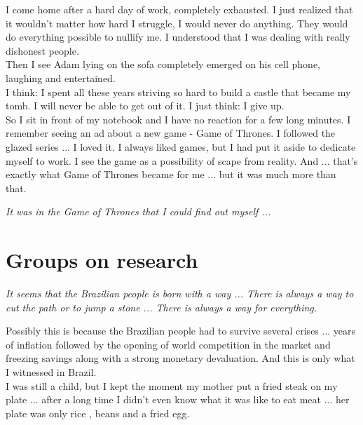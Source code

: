 \documentclass[11pt]{book}
\begin{document}
\noindent I come home after a hard day of work, completely exhausted. I just realized that it wouldn't matter how hard I struggle, I would never do anything. They would do everything possible to nullify me. I understood that I was dealing with really dishonest people. \\

\noindent Then I see Adam lying on the sofa completely emerged on his cell phone, laughing and entertained. \\

\noindent I think: I spent all these years striving so hard to build a castle that became my tomb. I will never be able to get out of it. I just think: I give up. \\

\noindent So I sit in front of my notebook and I have no reaction for a few long minutes. I remember seeing an ad about a new game - Game of Thrones. I followed the glazed series ... I loved it. I always liked games, but I had put it aside to dedicate myself to work. I see the game as a possibility of scape from reality. And ... that's exactly what Game of Thrones became for me ... but it was much more than that. \\

\noindent \begin{center} \emph{It was in the Game of Thrones that I could find out myself ...} \end{center} 

\chapter{Groups on research}

\noindent \begin{center} \emph{It seems that the Brazilian people is born with a way ... There is always a way to cut the path or to jump a stone ... There is always a way for everything.} \end{center} 

\noindent Possibly this is because the Brazilian people had to survive several crises ... years of inflation followed by the opening of world competition in the market and freezing savings along with a strong monetary devaluation. And this is only what I witnessed in Brazil. \\

\noindent I was still a child, but I kept the moment my mother put a fried steak on my plate ... after a long time I didn't even know what it was like to eat meat ... her plate was only rice , beans and a fried egg. \\
\end{document}

